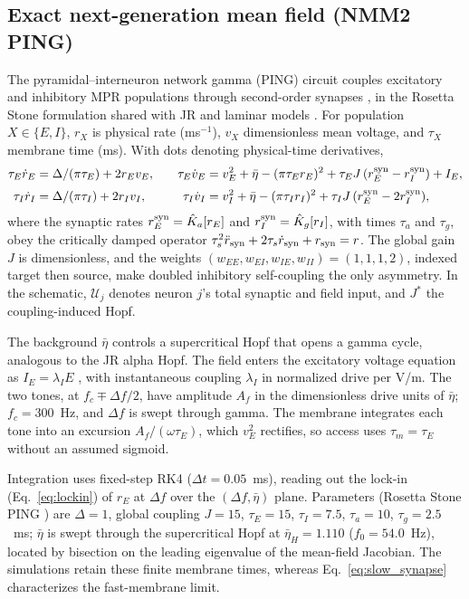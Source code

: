 \subsection{Exact next-generation mean field (NMM2 PING)}\label{sec:nmm2-methods}
The pyramidal--interneuron network gamma (PING) circuit couples excitatory
and inhibitory MPR populations through second-order synapses
\cite{montbrio2015,ruffini2021nmm2,clusella2023}, in the Rosetta Stone
formulation shared with JR and laminar models \cite{ruffini2025rosetta}.
For population $X\in\{E,I\}$, $r_X$ is physical rate (ms$^{-1}$),
$v_X$ dimensionless mean voltage, and $\tau_X$ membrane time (ms).
With dots denoting physical-time derivatives,
\begin{equation}
\begin{aligned}
\tau_E\dot r_E&=\Delta/(\pi\tau_E)+2r_Ev_E, &\quad
\tau_E\dot v_E&=v_E^2+\bar\eta-(\pi\tau_E r_E)^2+\tau_E J\,(r_E^{\rm syn}-r_I^{\rm syn})+I_E,\\[2pt]
\tau_I\dot r_I&=\Delta/(\pi\tau_I)+2r_Iv_I, &\quad
\tau_I\dot v_I&=v_I^2+\bar\eta-(\pi\tau_I r_I)^2+\tau_I J\,(r_E^{\rm syn}-2r_I^{\rm syn}),
\end{aligned}
\label{eq:nmm2-ping}
\end{equation}
where the synaptic rates $r_E^{\rm syn}=\hat K_a[r_E]$ and
$r_I^{\rm syn}=\hat K_g[r_I]$, with times $\tau_a$ and $\tau_g$,
obey the critically damped operator
$\tau_s^2\ddot r_{\rm syn}+2\tau_s\dot r_{\rm syn}+r_{\rm syn}=r$.
The global gain $J$ is dimensionless, and the weights
$(w_{EE},w_{EI},w_{IE},w_{II})=(1,1,1,2)$, indexed target then source, make doubled
inhibitory self-coupling the only asymmetry. In the schematic, $\mathcal U_j$ denotes
neuron $j$'s total synaptic and field input, and $J^*$ the coupling-induced Hopf.

The background $\bar\eta$ controls a supercritical Hopf that opens a gamma cycle,
analogous to the JR alpha Hopf. The field enters the excitatory voltage equation as
$I_E=\lambda_I E$ \cite{ruffini2021nmm2}, with instantaneous coupling $\lambda_I$ in
normalized drive per V/m. The two tones, at $f_c\mp\Delta f/2$, have amplitude
$A_f$ in the dimensionless drive units of $\bar\eta$; $f_c=300$~Hz, and $\Delta f$
is swept through gamma. The membrane integrates each tone into an excursion
$A_f/(\omega\tau_E)$, which $v_E^2$ rectifies, so access uses $\tau_m=\tau_E$ without
an assumed sigmoid.

Integration uses fixed-step RK4 ($\Delta t=0.05$~ms), reading out the lock-in
(Eq.~\eqref{eq:lockin}) of $r_E$ at $\Delta f$ over the $(\Delta f, \bar\eta)$ plane.
Parameters (Rosetta Stone PING \cite{ruffini2025rosetta}) are $\Delta=1$, global
coupling $J=15$, $\tau_E=15$, $\tau_I=7.5$, $\tau_a=10$, $\tau_g=2.5$~ms;
$\bar\eta$ is swept through the supercritical Hopf at $\bar\eta_H=1.110$
($f_0=54.0$~Hz), located by bisection on the leading eigenvalue of the mean-field
Jacobian. The simulations retain these finite membrane times, whereas
Eq.~\eqref{eq:slow_synapse} characterizes the fast-membrane limit.

